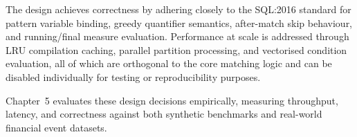The design achieves correctness by adhering closely to the
SQL:2016 standard for pattern variable binding, greedy quantifier
semantics, after-match skip behaviour, and running/final measure
evaluation.  Performance at scale is addressed through LRU
compilation caching, parallel partition processing, and vectorised
condition evaluation, all of which are orthogonal to the core
matching logic and can be disabled individually for testing or
reproducibility purposes.

Chapter~5 evaluates these design decisions empirically, measuring
throughput, latency, and correctness against both synthetic
benchmarks and real-world financial event datasets.
